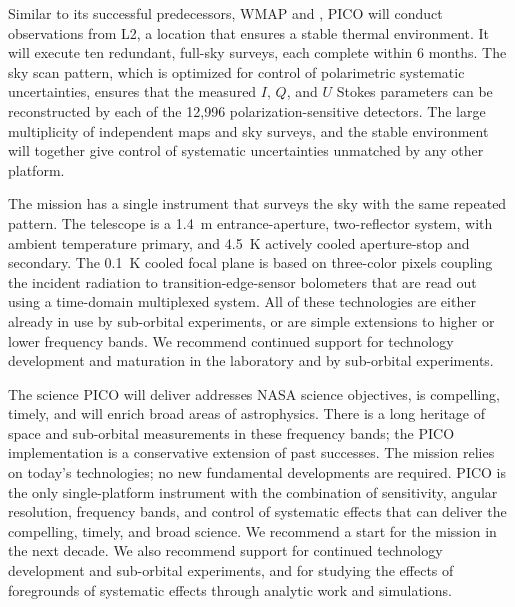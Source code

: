 \documentclass[PICOReport.tex]{subfiles}
\begin{document}
\afterpage{%
  \switchToLayoutPageB{}
    
   \clearpage
\switchToLayoutPageA{}
}

Similar to its successful predecessors, WMAP and \planck , PICO will conduct observations from L2, a location that ensures a stable thermal environment.  It will execute ten redundant,  full-sky surveys, each complete within 6 months. The sky scan pattern, which is optimized for control of polarimetric systematic uncertainties, ensures that the measured $I,\, Q$, and $U$ Stokes parameters can be reconstructed by each of the 12,996 polarization-sensitive detectors. The large multiplicity of independent maps and sky surveys, and the stable environment will together give control of systematic uncertainties unmatched by any other platform.

The mission has a single instrument that surveys the sky with the same repeated pattern.  The telescope is a 1.4~m entrance-aperture, two-reflector system, with ambient temperature primary, and 4.5~K actively cooled aperture-stop and secondary. The 0.1~K cooled focal plane is based on three-color pixels coupling the incident radiation to transition-edge-sensor bolometers that are read out using a time-domain multiplexed system. All of these technologies are either already in use by sub-orbital experiments, or are simple extensions to higher or lower frequency bands. We recommend continued support for technology development and maturation in the laboratory and by sub-orbital experiments. 

The science PICO will deliver addresses NASA science objectives, is compelling, timely, and will enrich broad areas of astrophysics. There is a long heritage of space and sub-orbital measurements in these frequency bands; the PICO implementation is a conservative extension of past successes. The mission relies on today's technologies; no new fundamental developments are required. PICO is the only single-platform instrument with the combination of sensitivity, angular resolution, frequency bands, and control of systematic effects that can deliver the compelling, timely, and broad science. We recommend a start for the mission in the next decade. We also recommend support for continued technology development and sub-orbital experiments, and for studying the effects of foregrounds of systematic effects through analytic work and simulations. 
\end{document}
